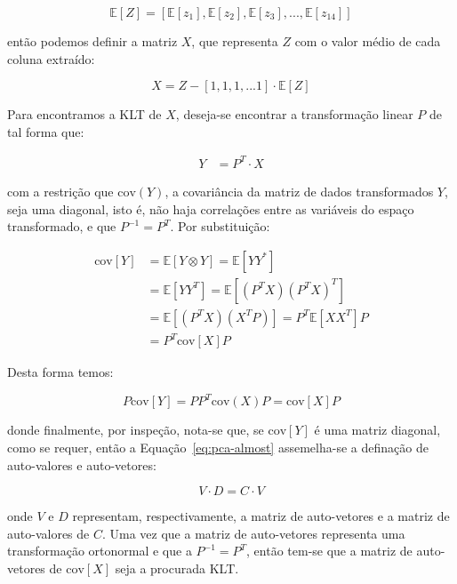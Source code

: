 \begin{equation}
\mathbb{E}[Z] = [\mathbb{E}[z_1], \mathbb{E}[z_2], \mathbb{E}[z_3], ...,
\mathbb{E}[z_{14}]]
\end{equation}

\noindent então podemos definir a matriz $X$, que representa $Z$ com o valor
médio de cada coluna extraído:

\begin{equation}
X = Z - [1, 1, 1, ... 1] \cdot \mathbb{E}[Z]
\end{equation}

Para encontramos a KLT de $X$, deseja-se encontrar a transformação linear $P$
de tal forma que:

\begin{align}
Y &= P^{T} \cdot X
\end{align}

\noindent com a restrição que $\text{cov}(Y)$, a covariância da matriz de
dados transformados $Y$, seja uma diagonal, isto é, não haja correlações entre
as variáveis do espaço transformado, e que $P^{-1} = P^{T}$. Por substituição:

\begin{align}
\text{cov}[Y] &= \mathbb{E}[Y \otimes Y] = \mathbb{E}[YY^{*}] \\
              &= \mathbb{E}[YY^T] = \mathbb{E}[(P^T X)(P^T X)^T] \\
              &= \mathbb{E}[(P^T X)(X^T P)] = P^T \mathbb{E}[XX^T] P \\
              &= P^T \text{cov}[X] P
\end{align}

Desta forma temos:

\begin{equation}
P\text{cov}[Y] = PP^T\text{cov}(X)P = \text{cov}[X]P
\label{eq:pca-almost}
\end{equation}

\noindent donde finalmente, por inspeção, nota-se que, se $\text{cov}[Y]$ é
uma matriz diagonal, como se requer, então a Equação~\ref{eq:pca-almost}
assemelha-se a definação de auto-valores e auto-vetores:

\begin{equation}
V \cdot D = C \cdot V
\end{equation}

\noindent onde $V$ e $D$ representam, respectivamente, a matriz de
auto-vetores e a matriz de auto-valores de $C$. Uma vez que a matriz de
auto-vetores representa uma transformação ortonormal e que a $P^{-1} = P^T$,
então tem-se que a matriz de auto-vetores de $\text{cov}[X]$ seja a procurada
KLT. 

